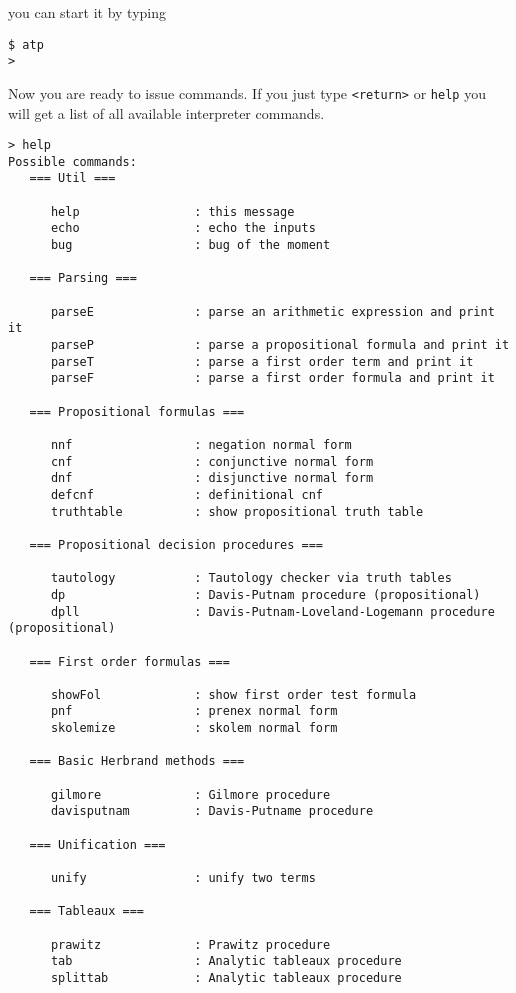 \documentclass{article}
\begin{document}
you can start it by typing

\begin{verbatim} 
$ atp
> 
\end{verbatim} 

Now you are ready to issue commands.  If you just type \texttt{<return>}
or \texttt{help} you will get a list of all available interpreter commands.

\begin{verbatim} 
> help
Possible commands:
   === Util ===
    
      help                : this message
      echo                : echo the inputs
      bug                 : bug of the moment
    
   === Parsing ===
    
      parseE              : parse an arithmetic expression and print it
      parseP              : parse a propositional formula and print it
      parseT              : parse a first order term and print it
      parseF              : parse a first order formula and print it
    
   === Propositional formulas ===
    
      nnf                 : negation normal form
      cnf                 : conjunctive normal form
      dnf                 : disjunctive normal form
      defcnf              : definitional cnf
      truthtable          : show propositional truth table
    
   === Propositional decision procedures ===
    
      tautology           : Tautology checker via truth tables
      dp                  : Davis-Putnam procedure (propositional)
      dpll                : Davis-Putnam-Loveland-Logemann procedure (propositional)
    
   === First order formulas ===
    
      showFol             : show first order test formula
      pnf                 : prenex normal form
      skolemize           : skolem normal form
    
   === Basic Herbrand methods ===
    
      gilmore             : Gilmore procedure
      davisputnam         : Davis-Putname procedure
    
   === Unification ===
    
      unify               : unify two terms
    
   === Tableaux ===
    
      prawitz             : Prawitz procedure
      tab                 : Analytic tableaux procedure
      splittab            : Analytic tableaux procedure
    

\end{verbatim}
\end{document}
